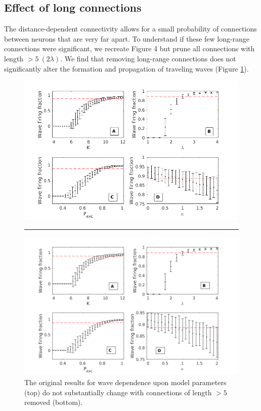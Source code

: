 \documentclass[12pt]{article}
\begin{document}
\subsection*{Effect of long connections}
\color{red}
The distance-dependent connectivity allows for a small probability of connections between neurons that are very far apart.
To understand if these few long-range connections were significant, we recreate Figure 4 but prune all connections with length $>5\ (2\lambda)$.
We find that removing long-range connections does not significantly alter the formation and propagation of traveling waves (Figure \ref{fig:wave_parameters_nolongconnections}).
\begin{figure}[!htb]
 \centering
 \includegraphics[width=\textwidth]{fig/ParamWaveSim} 
 \rule{\textwidth}{1bp}
 \includegraphics[width=\textwidth]{fig/ParamWaveSim_NoLongConnections}
 \caption{The original results for wave dependence upon model parameters (top) do not substantially change with connections of length $>5$ removed (bottom). }
 \label{fig:wave_parameters_nolongconnections}
\end{figure}


\color{black}
\end{document}
